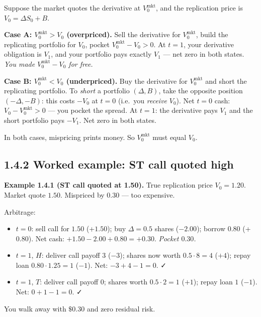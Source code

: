 \documentclass[
  10pt,
  twoside]{book}
\providecommand{\tightlist}{%
  \setlength{\itemsep}{0pt}\setlength{\parskip}{0pt}}
\begin{document}
Suppose the market quotes the derivative at \(V^{\text{mkt}}_0\), and
the replication price is \(V_0=\Delta S_0+B\).

\textbf{Case A: \(V^{\text{mkt}}_0 > V_0\) (overpriced).} Sell the
derivative for \(V^{\text{mkt}}_0\), build the replicating portfolio for
\(V_0\), pocket \(V^{\text{mkt}}_0-V_0>0\). At \(t=1\), your derivative
obligation is \(V_1\), and your portfolio pays exactly \(V_1\) --- net
zero in both states. \emph{You made \(V^{\text{mkt}}_0-V_0\) for free.}

\textbf{Case B: \(V^{\text{mkt}}_0 < V_0\) (underpriced).} Buy the
derivative for \(V^{\text{mkt}}_0\) and short the replicating portfolio.
To \emph{short} a portfolio \((\Delta,B)\), take the opposite position
\((-\Delta,-B)\): this costs \(-V_0\) at \(t=0\) (i.e.~you
\emph{receive} \(V_0\)). Net \(t=0\) cash:
\(V_0 - V^{\text{mkt}}_0 > 0\) --- you pocket the spread. At \(t=1\):
the derivative pays \(V_1\) and the short portfolio pays \(-V_1\). Net
zero in both states.

In both cases, mispricing prints money. So \(V^{\text{mkt}}_0\) must
equal \(V_0\).

\subsection{1.4.2 Worked example: ST call quoted
high}\label{worked-example-st-call-quoted-high}

\textbf{Example 1.4.1 (ST call quoted at 1.50).} True replication price
\(V_0=1.20\). Market quote \(1.50\). Mispriced by \(0.30\) --- too
expensive.

Arbitrage:

\begin{itemize}
\tightlist
\item
  \(t=0\): sell call for \(1.50\) (+\(1.50\)); buy \(\Delta=0.5\) shares
  (\(-2.00\)); borrow \(0.80\) (+\(0.80\)). Net cash:
  \(+1.50 - 2.00 + 0.80 = +0.30\). \emph{Pocket \(0.30\).}
\item
  \(t=1\), \(H\): deliver call payoff \(3\) (\(-3\)); shares now worth
  \(0.5\cdot 8 = 4\) (\(+4\)); repay loan \(0.80\cdot 1.25=1\) (\(-1\)).
  Net: \(-3+4-1=0\). ✓
\item
  \(t=1\), \(T\): deliver call payoff \(0\); shares worth
  \(0.5\cdot 2=1\) (\(+1\)); repay loan \(1\) (\(-1\)). Net:
  \(0+1-1=0\). ✓
\end{itemize}

You walk away with \(\$0.30\) and zero residual risk.
\end{document}
